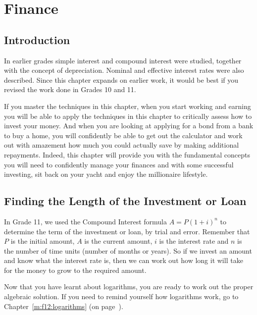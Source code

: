 \chapter{Finance}
\label{m:f12}

\section{Introduction}
In earlier grades simple interest and compound interest were studied, together with the concept of depreciation. Nominal and effective interest rates were also described. Since this chapter expands on earlier work, it would be best if you revised the work done in Grades 10 and 11.%

If you master the techniques in this chapter, when you start working and earning you will be able to apply the techniques in this chapter to critically assess how to invest your money. And when you are looking at applying for a bond from a bank to buy a home, you will confidently be able to get out the calculator and work out with amazement how much you could actually save by making additional repayments. Indeed, this chapter will provide you with the fundamental concepts you will need to confidently manage your finances and with some successful investing, sit back on your yacht and enjoy the millionaire lifestyle.

\section{Finding the Length of the Investment or Loan}
\label{sec:m:f12:term}


In Grade 11, we used the Compound Interest formula $A = P(1 + i)^n$ to determine the term of the investment or loan, by trial and error. Remember that $P$ is the initial amount, $A$ is the current amount, $i$ is the interest rate and $n$ is the number of time units (number of months or years). So if we invest an amount and know what the interest rate is, then we can work out how long it will take for the money to grow to the required amount.

Now that you have learnt about logarithms, you are ready to work out the proper algebraic solution. If you need to remind yourself how logarithms work, go to Chapter~\ref{m:f12:logarithms} (on page~\pageref{m:f12:logarithms}).

